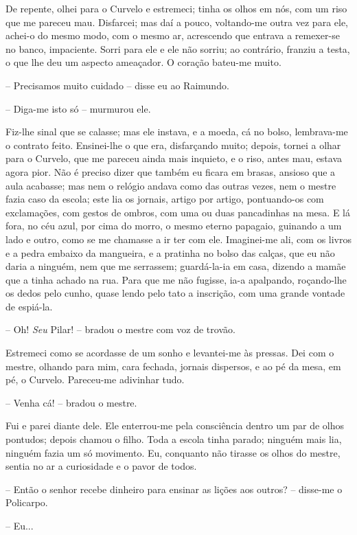 De repente, olhei para o Curvelo e estremeci; tinha os olhos em nós, com
um riso que me pareceu mau. Disfarcei; mas daí a pouco, voltando-me
outra vez para ele, achei-o do mesmo modo, com o mesmo ar, acrescendo
que entrava a remexer-se no banco, impaciente. Sorri para ele e ele não
sorriu; ao contrário, franziu a testa, o que lhe deu um aspecto
ameaçador. O coração bateu-me muito.

-- Precisamos muito cuidado -- disse eu ao Raimundo.

-- Diga-me isto só -- murmurou ele.

Fiz-lhe sinal que se calasse; mas ele instava, e a moeda, cá no bolso,
lembrava-me o contrato feito. Ensinei-lhe o que era, disfarçando muito;
depois, tornei a olhar para o Curvelo, que me pareceu ainda mais
inquieto, e o riso, antes mau, estava agora pior. Não é preciso dizer
que também eu ficara em brasas, ansioso que a aula acabasse; mas nem o
relógio andava como das outras vezes, nem o mestre fazia caso da escola;
este lia os jornais, artigo por artigo, pontuando-os com exclamações,
com gestos de ombros, com uma ou duas pancadinhas na mesa. E lá fora, no
céu azul, por cima do morro, o mesmo eterno papagaio, guinando a um lado
e outro, como se me chamasse a ir ter com ele. Imaginei-me ali, com os
livros e a pedra embaixo da mangueira, e a pratinha no bolso das calças,
que eu não daria a ninguém, nem que me serrassem; guardá-la-ia em casa,
dizendo a mamãe que a tinha achado na rua. Para que me não fugisse, ia-a
apalpando, roçando-lhe os dedos pelo cunho, quase lendo pelo tato a
inscrição, com uma grande vontade de espiá-la.

-- Oh! \emph{Seu} Pilar! -- bradou o mestre com voz de trovão.

Estremeci como se acordasse de um sonho e levantei-me às pressas. Dei
com o mestre, olhando para mim, cara fechada, jornais dispersos, e ao pé
da mesa, em pé, o Curvelo. Pareceu-me adivinhar tudo.

-- Venha cá! -- bradou o mestre.

Fui e parei diante dele. Ele enterrou-me pela consciência dentro um par
de olhos pontudos; depois chamou o filho. Toda a escola tinha parado;
ninguém mais lia, ninguém fazia um só movimento. Eu, conquanto não
tirasse os olhos do mestre, sentia no ar a curiosidade e o pavor de
todos.

-- Então o senhor recebe dinheiro para ensinar as lições aos outros? --
disse-me o Policarpo.

-- Eu...

